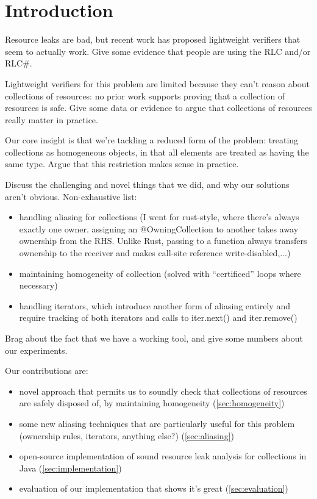 \section{Introduction}
\label{sec:intro}


Resource leaks are bad, but recent work has proposed
lightweight verifiers that seem to actually work. Give some
evidence that people are using the RLC and/or RLC\#.

Lightweight verifiers for this problem are limited because they can't reason
about collections of resources: no prior work supports proving that a collection
of resources is safe. Give some data or evidence to argue that collections
of resources really matter in practice. 

Our core insight is that we're tackling a reduced form of the problem:
treating collections as homogeneous objects, in that all elements are treated
as having the same type. Argue that this restriction makes sense in practice.

Discuss the challenging and novel things that we did, and why our solutions aren't
obvious. Non-exhaustive list:
\begin{itemize}
  \item handling aliasing for collections (I went for rust-style, where there’s always exactly one owner. assigning an @OwningCollection to another takes away ownership from the RHS. Unlike Rust, passing to a function always transfers ownership to the receiver and makes call-site reference write-disabled,...)
\item maintaining homogeneity of collection (solved with “certificed” loops where necessary)
\item handling iterators, which introduce another form of aliasing entirely and require tracking of both iterators and calls to iter.next() and iter.remove()
\end{itemize}

Brag about the fact that we have a working tool, and give some numbers about our experiments.

Our contributions are:
\begin{itemize}
\item novel approach that permits us to soundly check that collections of resources are safely disposed of,
  by maintaining homogeneity (\cref{sec:homogeneity})
\item some new aliasing techniques that are particularly useful for this problem (ownership rules, iterators, anything else?) (\cref{sec:aliasing})
\item open-source implementation of sound resource leak analysis for collections in Java (\cref{sec:implementation})
\item evaluation of our implementation that shows it's great (\cref{sec:evaluation})
\end{itemize}
